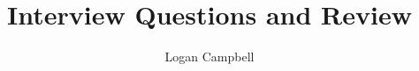 \documentclass[titlepage]{article}
\begin{document}
\title{\textbf{Interview Questions and Review} \bigskip}
\author{Logan Campbell \bigskip}
\date{ \bigskip}
\maketitle
\pagestyle{empty}
\end{document}
